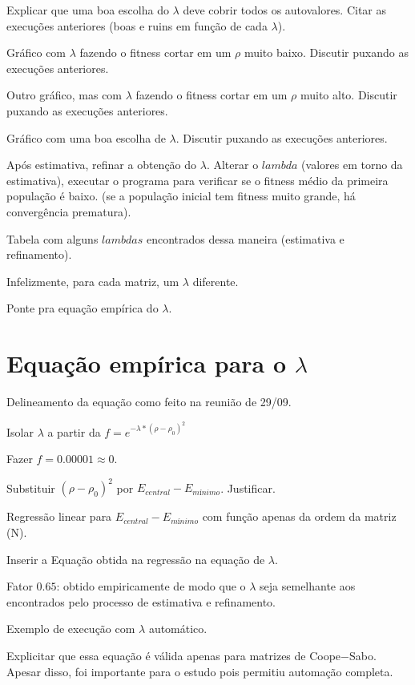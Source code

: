 	Explicar que uma boa escolha do $\lambda$ deve cobrir todos os autovalores. Citar as execuções anteriores (boas e ruins em função de cada $\lambda$).
	
	Gráfico com $\lambda$ fazendo o fitness cortar em um $\rho$ muito baixo. Discutir puxando as execuções anteriores.
	
	Outro gráfico, mas com $\lambda$ fazendo o fitness cortar em um $\rho$ muito alto. Discutir puxando as execuções anteriores.
	
	Gráfico com uma boa escolha de $\lambda$. Discutir puxando as execuções anteriores.
	
	Após estimativa, refinar a obtenção do $\lambda$. Alterar o $lambda$ (valores em torno da estimativa), executar o programa para verificar se o fitness médio da primeira população é baixo. (se a população inicial tem fitness muito grande, há convergência prematura).
	
	Tabela com alguns $lambdas$ encontrados dessa maneira (estimativa e refinamento).
	
	Infelizmente, para cada matriz, um $\lambda$ diferente.
	
	Ponte pra equação empírica do $\lambda$.
	
	\section{Equação empírica para o $\lambda$}
	
	Delineamento da equação como feito na reunião de 29/09.
	
	Isolar $\lambda$ a partir da $f=e^{-\lambda*(\rho - \rho_0)^2}$
	
	Fazer $f = 0.00001 \approx 0$.
	
	Substituir $(\rho - \rho_0)^2$ por $E_{central} - E_{mínimo}$. Justificar.
	
	Regressão linear para $E_{central} - E_{mínimo}$ com função apenas da ordem da matriz (N).
	
	Inserir a Equação obtida na regressão na equação de $\lambda$.
	
	Fator $0.65$: obtido empiricamente de modo que o $\lambda$ seja semelhante aos encontrados pelo processo de estimativa e refinamento.
	
	Exemplo de execução com $\lambda$ automático.
	
	Explicitar que essa equação é válida apenas para matrizes de Coope$-$Sabo. Apesar disso, foi importante para o estudo pois permitiu automação completa.
		
